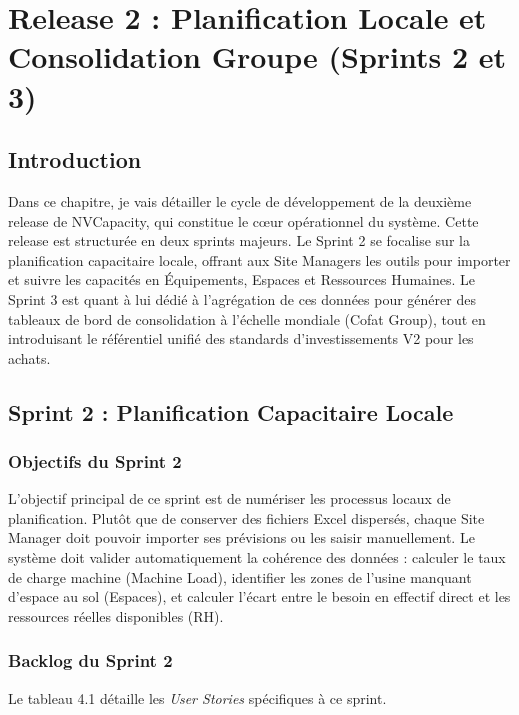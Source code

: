 \chapter{Release 2 : Planification Locale et Consolidation Groupe (Sprints 2 et 3)}

\section*{Introduction}

Dans ce chapitre, je vais détailler le cycle de développement de la deuxième release de NVCapacity, qui constitue le cœur opérationnel du système. Cette release est structurée en deux sprints majeurs. Le Sprint 2 se focalise sur la planification capacitaire locale, offrant aux Site Managers les outils pour importer et suivre les capacités en Équipements, Espaces et Ressources Humaines. Le Sprint 3 est quant à lui dédié à l'agrégation de ces données pour générer des tableaux de bord de consolidation à l'échelle mondiale (Cofat Group), tout en introduisant le référentiel unifié des standards d'investissements V2 pour les achats.

\section{Sprint 2 : Planification Capacitaire Locale} 

\subsection{Objectifs du Sprint 2}

L'objectif principal de ce sprint est de numériser les processus locaux de planification. Plutôt que de conserver des fichiers Excel dispersés, chaque Site Manager doit pouvoir importer ses prévisions ou les saisir manuellement. Le système doit valider automatiquement la cohérence des données : calculer le taux de charge machine (Machine Load), identifier les zones de l'usine manquant d'espace au sol (Espaces), et calculer l'écart entre le besoin en effectif direct et les ressources réelles disponibles (RH).

\subsection{Backlog du Sprint 2}

Le tableau 4.1 détaille les \textit{User Stories} spécifiques à ce sprint.

